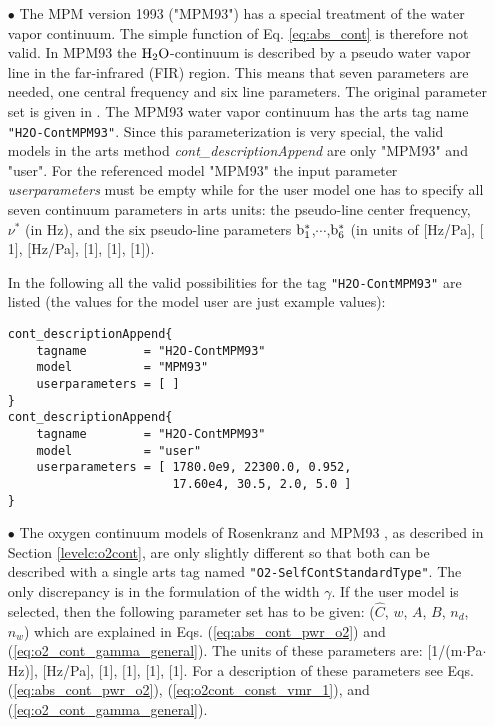 {\begin{itemize}
\item[$\bullet$] The MPM version 1993 ("MPM93") \citep{liebeetal:93} 
has a special treatment of the water vapor continuum. The simple 
function of Eq. \ref{eq:abs_cont} is therefore not valid. In MPM93 
the $\mbox{H}_2\mbox{O}$-continuum is described by a pseudo water vapor line in the 
far-infrared (FIR) region. This means that seven parameters are 
needed, one central frequency and six line parameters. The original 
parameter set is given in \cite{liebeetal:93}. The MPM93 water vapor 
continuum has the arts tag name {\tt "H2O-ContMPM93"}. Since this 
parameterization is very special, the valid models 
in the arts method {\it cont\_descriptionAppend} are only 
"MPM93" and "user". For the referenced model "MPM93" the 
input parameter {\it userparameters} must be empty while 
for the user model one has to specify all seven continuum 
parameters in arts units: the pseudo-line center frequency, 
$\nu^*$ (in Hz), and the six pseudo-line parameters $\rm b^*_{\rm 1}$,$\cdots$,$\rm b^*_{\rm 6}$ 
(in units of $[$Hz/Pa$]$, $[$1$]$, $[$Hz/Pa$]$, $[$1$]$, $[$1$]$, $[$1$]$).

In the following all the valid possibilities for the
tag {\tt "H2O-ContMPM93"} are listed (the values for the 
model user are just example values):
\begin{verbatim}
cont_descriptionAppend{
    tagname        = "H2O-ContMPM93"
    model          = "MPM93"
    userparameters = [ ]
}
cont_descriptionAppend{
    tagname        = "H2O-ContMPM93"
    model          = "user"
    userparameters = [ 1780.0e9, 22300.0, 0.952, 
                       17.60e4, 30.5, 2.0, 5.0 ]
}
\end{verbatim}


\item[$\bullet$] The oxygen continuum models of Rosenkranz \citep{pwr:93}
and MPM93 \citep{liebeetal:93}, as described in Section \ref{levelc:o2cont}, 
are only slightly different so that both can be described with a single arts 
tag named {\tt "O2-SelfContStandardType"}. The only discrepancy is in the 
formulation of the width $\gamma$. If the user model is selected, then the 
following parameter set has to be given:
($\widehat{C}$, $w$, $A$, $B$, $n_d$, $n_w$) which are explained in 
Eqs. (\ref{eq:abs_cont_pwr_o2}) and (\ref{eq:o2_cont_gamma_general}). 
The units of these parameters are: $[$1/(m$\cdot$Pa$\cdot$Hz)$]$, 
$[$Hz/Pa$]$, $[$1$]$, $[$1$]$, $[$1$]$, $[$1$]$. For a description of 
these parameters see Eqs. (\ref{eq:abs_cont_pwr_o2}), 
(\ref{eq:o2cont_const_vmr_1}), and (\ref{eq:o2_cont_gamma_general}).


\end{itemize}}

